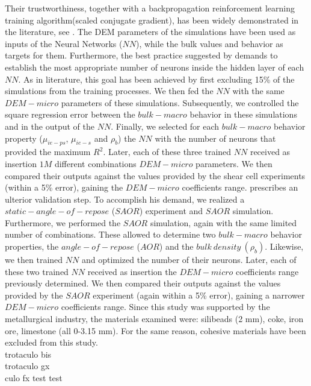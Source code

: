 Their trustworthiness, together with a backpropagation reinforcement learning training algorithm(scaled conjugate gradient), has been widely demonstrated in the literature, see \citet{RefWorks:158}.
The DEM parameters of the simulations have been used as inputs of the Neural Networks ($NN$), while the bulk values and behavior as targets for them.
Furthermore, the best practice suggested by \citet{RefWorks:150} demands to establish the most appropriate number of neurons inside the hidden layer of each $NN$.
As in literature, this goal has been achieved by first excluding 15\% of the simulations from the training processes.
We then fed the $NN$ with the same $DEM-micro$ parameters of these simulations.
Subsequently, we controlled the square regression error between the $bulk-macro$ behavior in these simulations and in the output of the $NN$.
Finally, we selected for each $bulk-macro$ behavior property ($\mu_{ie-ps}$, $\mu_{ie-s}$ and $\rho_b$) the $NN$ with the number of neurons that provided the maximum $R^2$.
Later, each of these three trained $NN$ received as insertion $1M$ different combinations $DEM-micro$ parameters.
We then compared their outputs against the values provided by the shear cell experiments (within a 5\% error), gaining the $DEM-micro$ coefficients range.
\citet{RefWorks:160} prescribes an ulterior validation step.
To accomplish his demand, we realized a $static-angle-of-repose$ ($SAOR$) experiment and $SAOR$ simulation.
Furthermore, we performed the $SAOR$ simulation, again with the same limited number of combinations.
These allowed to determine two $bulk-macro$ behavior properties, the $angle-of-repose$ ($AOR$) and the $bulk ~ density ~ (\rho_b)$.
Likewise, we then trained $NN$ and optimized the number of their neurons.
Later, each of these two trained $NN$ received as insertion the $DEM-micro$ coefficients range previously determined.
We then compared their outputs against the values provided by the $SAOR$ experiment (again within a 5\% error), gaining a narrower $DEM-micro$ coefficients range.
Since this study was supported by the metallurgical industry, the materials examined were: silibeads (2 mm), coke, iron ore, limestone (all 0-3.15 mm).
For the same reason, cohesive materials have been excluded from this study.\\ \label{par:materials}
trotaculo bis \\
trotaculo gx \\
culo fx
test
test